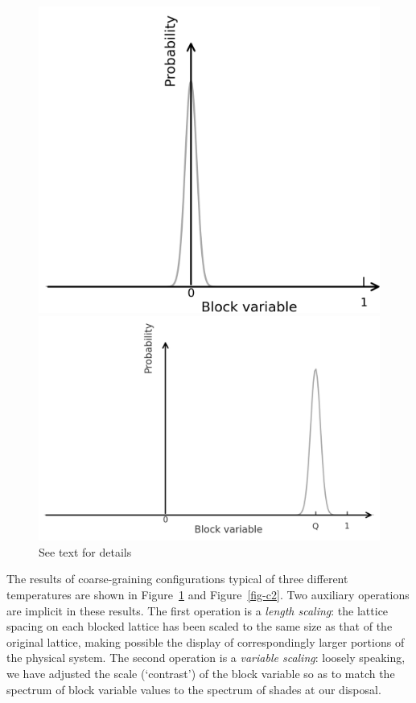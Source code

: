 \documentclass[
  letterpaper,
  enabledeprecatedfontcommands]{report}
\begin{document}
\begin{figure}
\begin{minipage}{0.50\linewidth}
\end{minipage}%
\newline
\begin{minipage}{0.50\linewidth}

\includegraphics[width=0.6\linewidth,height=\textheight,keepaspectratio]{phase-transitions/Figs/schem_op_disordered.png}

\end{minipage}%
%
\begin{minipage}{0.50\linewidth}

\includegraphics[width=0.84\linewidth,height=\textheight,keepaspectratio]{phase-transitions/Figs/schem_op_ordered.png}

\end{minipage}%

\caption{\label{fig-c1}See text for details}

\end{figure}%

The results of coarse-graining configurations typical of three different
temperatures are shown in Figure~\ref{fig-c1} and Figure~\ref{fig-c2}.
Two auxiliary operations are implicit in these results. The first
operation is a \emph{length scaling}: the lattice spacing on each
blocked lattice has been scaled to the same size as that of the original
lattice, making possible the display of correspondingly larger portions
of the physical system. The second operation is a \emph{variable
scaling}: loosely speaking, we have adjusted the scale (`contrast') of
the block variable so as to match the spectrum of block variable values
to the spectrum of shades at our disposal.
\end{document}
